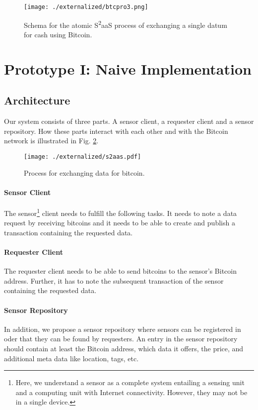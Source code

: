 \begin{figure}
\centering
\texttt{[image: ./externalized/btcpro3.png]}
\caption{Schema for the atomic  S\textsuperscript{2}aaS process of exchanging a single datum for cash using Bitcoin.}
\label{fig:btcDataExchange}
\end{figure}

\section{Prototype I: Naive Implementation}

\subsection{Architecture}

Our system consists of three parts. A sensor client, a requester client and a sensor repository. How these parts interact with each other and with the Bitcoin network is illustrated in Fig. \ref{fig:process}.

\begin{figure}
\begin{center}
\texttt{[image: ./externalized/s2aas.pdf]}
\caption{Process for exchanging data for bitcoin.}
\label{fig:process}
\end{center}
\end{figure}

\paragraph{Sensor Client}
The sensor\footnote{Here, we understand a sensor as a complete system entailing a sensing unit and a computing unit with Internet connectivity. However, they may not be in a single device.} client needs to fulfill the following tasks. It needs to note a data
request by receiving bitcoins and it needs to be able to create and publish a
transaction containing the requested data.

\paragraph{Requester Client}
The requester client needs to be able to send bitcoins to the sensor's Bitcoin
address. Further, it has to note the subsequent transaction of the sensor
containing the requested data.

\paragraph{Sensor Repository}
In addition, we propose a sensor repository where sensors can be registered in
oder that they can be found by requesters. An entry in the sensor repository should
contain at least the Bitcoin address, which data it offers, the price, and
additional meta data like location, tags, etc.

